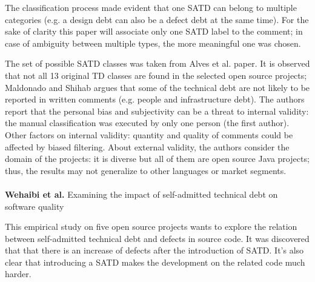 The classification process made evident that one SATD can belong to multiple categories (e.g. a design debt can also be a defect debt at the same time). For the sake of clarity this paper will associate only one SATD label to the comment; in case of ambiguity between multiple types, the more meaningful one was chosen. 

The set of possible SATD classes was taken from Alves et al. \cite{alves2014towards} paper. It is observed that not all 13 original TD classes are found in the selected open source projects; Maldonado and Shihab argues that some of the technical debt are not likely to be reported in written comments (e.g. people and infrastructure debt).
The authors report that the personal bias and subjectivity can be a threat to internal validity: the manual classification was executed by only one person (the first author). Other factors on internal validity: quantity and quality of comments could be affected by biased filtering.
About external validity, the authors consider the domain of the projects: it is diverse but all of them are open source Java projects; thus,  the results may not generalize to other languages or market segments.
\\
\\
\textbf{Wehaibi et al.} \cite{wehaibi2016examining} Examining the impact of self-admitted technical debt on software quality

This empirical study on five open source projects wants to explore the relation between self-admitted technical debt and defects in source code. It was discovered that that there is an increase of defects after the introduction of SATD. It's also clear that introducing a SATD makes the development on the related code much harder.
\\
\\